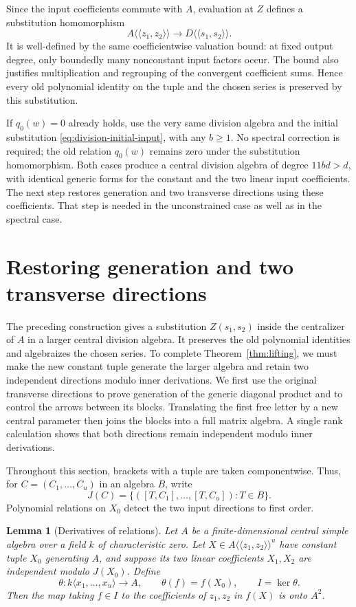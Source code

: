 \documentclass[11pt]{article}
\newtheorem{lemma}[theorem]{Lemma}
\theoremstyle{definition}
\theoremstyle{remark}
\numberwithin{equation}{section}
\begin{document}
Since the input coefficients commute with $A$, evaluation at $Z$
defines a substitution homomorphism
\[
 A\langle\!\langle z_1,z_2\rangle\!\rangle
 \longrightarrow D\langle\!\langle s_1,s_2\rangle\!\rangle.
\]
It is well-defined by the same coefficientwise valuation bound: at
fixed output degree, only boundedly many nonconstant input factors
occur.  The bound also justifies multiplication and regrouping of the
convergent coefficient sums.  Hence every old polynomial identity on
the tuple and the chosen series is preserved by this substitution.

If $q_0(w)=0$ already holds, use the very same division algebra and
the initial substitution \eqref{eq:division-initial-input}, with any
$b\ge1$.  No spectral correction is required; the old relation
$q_0(w)$ remains zero under the substitution homomorphism.  Both cases
produce a central division algebra of degree $11bd>d$, with identical
generic forms for the constant and the two linear input coefficients.
The next step restores generation and two transverse directions using
these coefficients.  That step is needed in the unconstrained case
as well as in the spectral case.

\section{Restoring generation and two transverse directions}
\label{sec:generation}

The preceding construction gives a substitution $Z(s_1,s_2)$ inside
the centralizer of $A$ in a larger central division algebra.  It
preserves the old polynomial identities and algebraizes the chosen
series.  To complete Theorem~\ref{thm:lifting}, we must
make the new constant tuple generate the larger algebra and retain
two independent directions modulo inner derivations. We first use the
original transverse directions to prove generation of the generic
diagonal product and to control the arrows between its blocks.
Translating the first free letter by a new central parameter then joins
the blocks into a full matrix algebra. A single rank calculation shows
that both directions remain independent modulo inner derivations.

Throughout this section, brackets with a tuple are taken componentwise.
Thus, for $C=(C_1,\ldots,C_u)$ in an algebra $B$, write
\[
 J(C)=\{([T,C_1],\ldots,[T,C_u]):T\in B\}.
\]
Polynomial relations on $X_0$ detect the two input directions to first
order.

\begin{lemma}[Derivatives of relations]
\label{lem:derivatives-of-relations}
Let $A$ be a finite-dimensional central simple algebra over a field
$k$ of characteristic zero.  Let
$X\in A\langle\!\langle z_1,z_2\rangle\!\rangle^u$ have constant
tuple $X_0$ generating $A$, and suppose its two linear coefficients
$X_1,X_2$ are independent modulo $J(X_0)$.  Define
\[
 \theta:k\langle x_1,\ldots,x_u\rangle\longrightarrow A,
 \qquad \theta(f)=f(X_0),\qquad I=\ker\theta.
\]
Then the map taking $f\in I$ to the coefficients of $z_1,z_2$ in
$f(X)$ is onto $A^2$.
\end{lemma}
\end{document}
